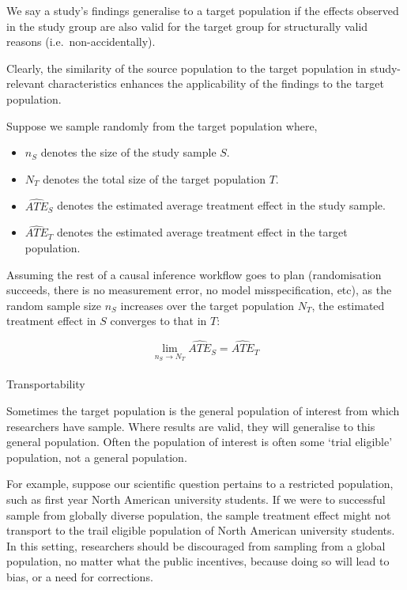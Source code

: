 \documentclass[
  single column]{article}
\makeatletter
\let\oldparagraph\paragraph
\renewcommand{\paragraph}{
    \@ifstar
      \xxxParagraphStar
      \xxxParagraphNoStar
  }
\newcommand{\xxxParagraphStar}[1]{\oldparagraph*{#1}\mbox{}}
\newcommand{\xxxParagraphNoStar}[1]{\oldparagraph{#1}\mbox{}}
\providecommand{\tightlist}{%
  \setlength{\itemsep}{0pt}\setlength{\parskip}{0pt}}\usepackage{longtable,booktabs,array}
\makeatother
\begin{document}
We say a study's findings generalise to a target population if the
effects observed in the study group are also valid for the target group
for structurally valid reasons (i.e.~non-accidentally).

Clearly, the similarity of the source population to the target
population in study-relevant characteristics enhances the applicability
of the findings to the target population.

Suppose we sample randomly from the target population where,

\begin{itemize}
\tightlist
\item
  \(n_S\) denotes the size of the study sample \(S\).
\item
  \(N_T\) denotes the total size of the target population \(T\).
\item
  \(\hat{ATE}_{S}\) denotes the estimated average treatment effect in
  the study sample.
\item
  \(\hat{ATE}_{T}\) denotes the estimated average treatment effect in
  the target population.
\end{itemize}

Assuming the rest of a causal inference workflow goes to plan
(randomisation succeeds, there is no measurement error, no model
misspecification, etc), as the random sample size \(n_S\) increases over
the target population \(N_T\), the estimated treatment effect in \(S\)
converges to that in \(T\):

\[
\lim_{n_S \to N_T} \hat{ATE}_{S} = \hat{ATE}_{T}
\]

\paragraph{Transportability}\label{transportability}

Sometimes the target population is the general population of interest
from which researchers have sample. Where results are valid, they will
generalise to this general population. Often the population of interest
is often some `trial eligible' population, not a general population.

For example, suppose our scientific question pertains to a restricted
population, such as first year North American university students. If we
were to successful sample from globally diverse population, the sample
treatment effect might not transport to the trail eligible population of
North American university students. In this setting, researchers should
be discouraged from sampling from a global population, no matter what
the public incentives, because doing so will lead to bias, or a need for
corrections.
\end{document}
